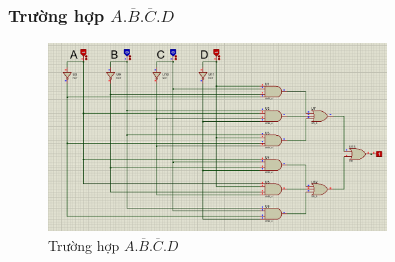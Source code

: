         \subsubsection{Trường hợp $A.\overline{B}.\overline{C}.D$}
            \begin{figure}[H]
                \centering
                \includegraphics[width=0.8\textwidth]{pictures/b2.5.png}
                \caption{Trường hợp $A.\overline{B}.\overline{C}.D$}
            \end{figure}
